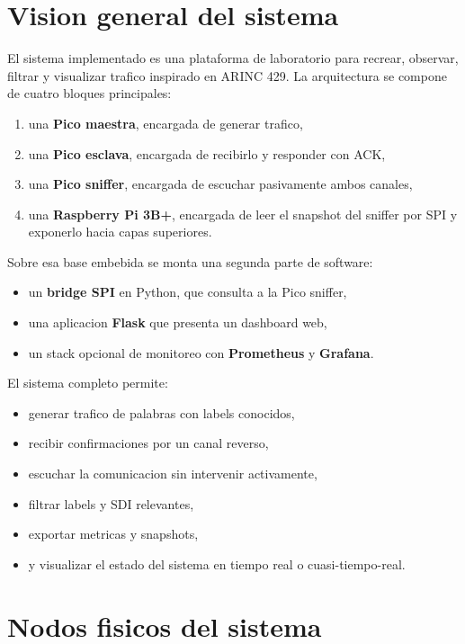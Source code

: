 \documentclass[12pt,a4paper]{report}
\begin{document}
\chapter{Vision general del sistema}

El sistema implementado es una plataforma de laboratorio para recrear, observar, filtrar y visualizar trafico inspirado en ARINC 429. La arquitectura se compone de cuatro bloques principales:

\begin{enumerate}
    \item una \textbf{Pico maestra}, encargada de generar trafico,
    \item una \textbf{Pico esclava}, encargada de recibirlo y responder con ACK,
    \item una \textbf{Pico sniffer}, encargada de escuchar pasivamente ambos canales,
    \item una \textbf{Raspberry Pi 3B+}, encargada de leer el snapshot del sniffer por SPI y exponerlo hacia capas superiores.
\end{enumerate}

Sobre esa base embebida se monta una segunda parte de software:

\begin{itemize}
    \item un \textbf{bridge SPI} en Python, que consulta a la Pico sniffer,
    \item una aplicacion \textbf{Flask} que presenta un dashboard web,
    \item un stack opcional de monitoreo con \textbf{Prometheus} y \textbf{Grafana}.
\end{itemize}

El sistema completo permite:

\begin{itemize}
    \item generar trafico de palabras con labels conocidos,
    \item recibir confirmaciones por un canal reverso,
    \item escuchar la comunicacion sin intervenir activamente,
    \item filtrar labels y SDI relevantes,
    \item exportar metricas y snapshots,
    \item y visualizar el estado del sistema en tiempo real o cuasi-tiempo-real.
\end{itemize}

\chapter{Nodos fisicos del sistema}
\end{document}
